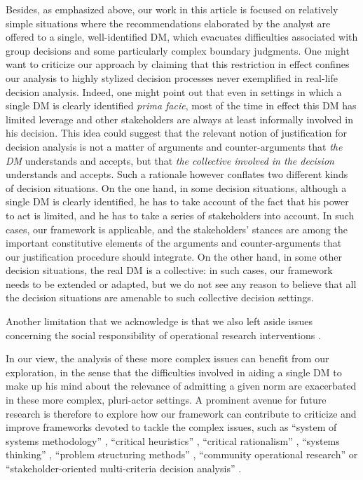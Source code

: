 \documentclass[preprint, french, english, 11pt, authoryear]{elsarticle}%
\begin{document}
Besides, as emphasized above, our work in this article is focused on relatively simple situations where the recommendations elaborated by the analyst are offered to a single, well-identified \ac{DM}, which evacuates difficulties associated with group decisions and some particularly complex boundary judgments. One might want to criticize our approach by claiming that this restriction in effect confines our analysis to highly stylized decision processes never exemplified in real-life decision analysis. Indeed, one might point out that even in settings in which a single \ac{DM} is clearly identified \emph{prima facie}, most of the time in effect this \ac{DM} has limited leverage and other stakeholders are always at least informally involved in his decision. This idea could suggest that the relevant notion of justification for decision analysis is not a matter of arguments and counter-arguments that \emph{the \ac{DM}} understands and accepts, but that \emph{the collective involved in the decision} understands and accepts. Such a rationale however conflates two different kinds of decision situations. On the one hand, in some decision situations, although a single \ac{DM} is clearly identified, he has to take account of the fact that his power to act is limited, and he has to take a series of stakeholders into account. In such cases, our framework is applicable, and the stakeholders' stances are among the important constitutive elements of the arguments and counter-arguments that our justification procedure should integrate. On the other hand, in some other decision situations, the real \ac{DM} is a collective: in such cases, our framework needs to be extended or adapted, but we do not see any reason to believe that all the decision situations are amenable to such collective decision settings. 

Another limitation that we acknowledge is that we also left aside issues concerning the social responsibility of operational research interventions \citep{ackoff_social_1974,gallo_operations_2004}.

In our view, the analysis of these more complex issues can benefit from our exploration, in the sense that the difficulties involved in aiding a single \ac{DM} to make up his mind about the relevance of admitting a given norm are exacerbated in these more complex, pluri-actor settings. A prominent avenue for future research is therefore to explore how our framework can contribute to criticize and improve frameworks devoted to tackle the complex issues, such as ``system of systems methodology'' \citep{jackson_towards_1984}, ``critical heuristics'' \citep{ulrich_critical_1987}, ``critical rationalism'' \citep{ormerod_critical_2014}, ``systems thinking'' \citep{mingers_review_2010}, ``problem structuring methods'' \citep{hector_problem-structuring_2009}, ``community operational research'' \citep{johnson_emerging_2018} or ``stakeholder-oriented multi-criteria decision analysis'' \citep{de_brucker_multi-criteria_2013}.
\end{document}
